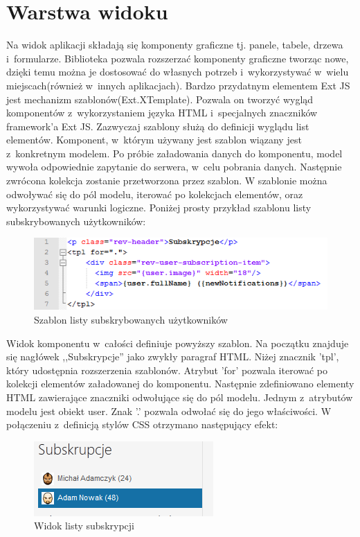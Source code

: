 \section{Warstwa widoku}

Na widok aplikacji składają się komponenty graficzne tj. panele, tabele, drzewa i~formularze. Biblioteka pozwala rozszerzać komponenty graficzne tworząc nowe, dzięki temu można je dostosować do własnych potrzeb i~wykorzystywać w~wielu miejscach(również w~innych aplikacjach). Bardzo przydatnym elementem Ext JS jest mechanizm szablonów(Ext.XTemplate). Pozwala on tworzyć wygląd komponentów z~wykorzystaniem języka HTML i~specjalnych znaczników framework'a Ext JS. Zazwyczaj szablony służą do definicji wyglądu list elementów. Komponent, w~którym używany jest szablon wiązany jest z~konkretnym modelem. Po próbie załadowania danych do komponentu, model wywoła odpowiednie zapytanie do serwera, w~celu pobrania danych. Następnie zwrócona kolekcja zostanie przetworzona przez szablon. W szablonie można odwoływać się do pól modelu, iterować po kolekcjach elementów, oraz wykorzystywać warunki logiczne. Poniżej prosty przykład szablonu listy subskrybowanych użytkowników:
 
\begin{figure}[H]
	\centering
	\includegraphics[width=\textwidth]{images/tpl.png}
	\caption{Szablon listy subskrybowanych użytkowników}
\end{figure}

Widok komponentu w~całości definiuje powyższy szablon. Na początku znajduje się nagłówek ,,Subskrypcje'' jako zwykły paragraf HTML. Niżej znacznik 'tpl', który udostępnia rozszerzenia szablonów. Atrybut 'for' pozwala iterować po kolekcji elementów załadowanej do komponentu. Następnie zdefiniowano elementy HTML zawierające znaczniki odwołujące się do pól modelu. Jednym z~atrybutów modelu jest obiekt user. Znak '.' pozwala odwołać się do jego właściwości. W połączeniu z~definicją stylów CSS otrzymano następujący efekt:
 
\begin{figure}[H]
	\centering
	\includegraphics{images/subs.png}
	\caption{Widok listy subskrypcji}
\end{figure}

